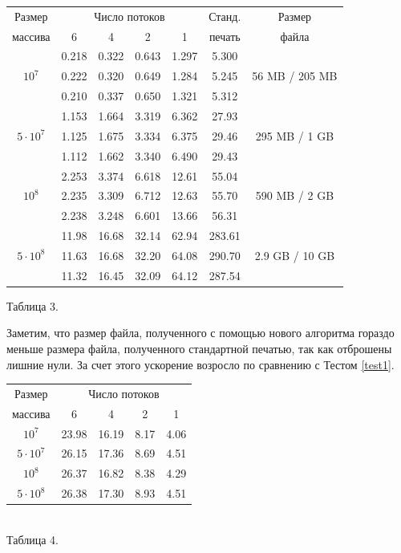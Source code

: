 \begin{center}
\begin{longtable}{||c|c|c|c|c|c|c||}
\hline
\hline
Размер & \multicolumn{4}{c|}{Число потоков} & Станд. & Размер\\
\hhline{~|-|-|-|-|~|~|}
массива & 6  & 4 & 2 & 1 & печать & файла\\
\hline
\hline
 & 0.218 & 0.322 & 0.643 & 1.297 & 5.300  &\\
\hhline{~|-|-|-|-|-|}
$10^7$ & 0.222 & 0.320 & 0.649 & 1.284 & 5.245  &56 MB / 205 MB \\
\hhline{~|-|-|-|-|-|}
 & 0.210 & 0.337 & 0.650 & 1.321 & 5.312  &\\
\hline
& 1.153 & 1.664 & 3.319 & 6.362 & 27.93  &\\
\hhline{~|-|-|-|-|-|}
$5 \cdot 10^7$& 1.125  & 1.675 & 3.334 & 6.375 & 29.46  &295 MB / 1 GB\\
\hhline{~|-|-|-|-|-|}
& 1.112  & 1.662 & 3.340 & 6.490 & 29.43  &\\
\hline
 & 2.253 &  3.374 & 6.618 & 12.61 & 55.04 & \\
\hhline{~|-|-|-|-|-|}
$10^8$ & 2.235 & 3.309 & 6.712 & 12.63 & 55.70  & 590 MB / 2 GB \\
\hhline{~|-|-|-|-|-|}
 & 2.238 & 3.248 & 6.601 & 13.66 & 56.31  &\\
\hline
 & 11.98 & 16.68 & 32.14 & 62.94 & 283.61  &\\
\hhline{~|-|-|-|-|-|}
$5 \cdot 10^8$ & 11.63 & 16.68 & 32.20 & 64.08 & 290.70  &2.9 GB / 10 GB\\
\hhline{~|-|-|-|-|-|}
 & 11.32 & 16.45 & 32.09 & 64.12 & 287.54  &\\
\hline
\hline
\end{longtable}
\small{Таблица 3.}
\end{center}

Заметим, что размер файла, полученного с помощью нового алгоритма гораздо меньше размера файла, полученного стандартной печатью, так как отброшены лишние нули.
За счет этого ускорение возросло по сравнению с Тестом \ref{test1}.

\begin{center}
\begin{tabular}{||c|c|c|c|c||}
\hline
\hline
Размер & \multicolumn{4}{c|}{Число потоков}\\
\hhline{~|-|-|-|-|}
массива & 6 & 4 & 2 & 1 \\
\hline
$10^7$  & 23.98  & 16.19 & 8.17 & 4.06 \\
\hline
$5 \cdot 10^7$ & 26.15 & 17.36& 8.69 & 4.51 \\
\hline
$10^8$ & 26.37 & 16.82 & 8.38 & 4.29 \\
\hline
$5 \cdot 10^8$ & 26.38  & 17.30 & 8.93& 4.51 \\
\hline
\hline
\end{tabular}
\\
\vspace{14pt}
\small{Таблица 4.}
\end{center}

